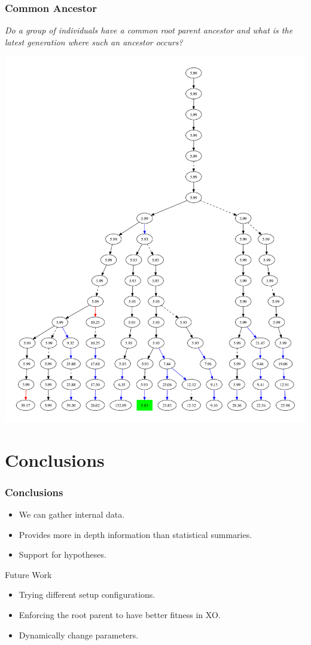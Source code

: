 \documentclass{beamer}
\newcommand{\linespace}{\vskip 0.25cm}
\begin{document}
\begin{frame}
\frametitle{Common Ancestor}
\emph{Do a group of individuals have a common root parent ancestor and what is the latest generation where such an ancestor occurs?}
\begin{center}
\includegraphics[height=0.75\textheight]{subset_confluence_trimmed}
\end{center}

\end{frame}

\section[Conclusions]{Conclusions}

\begin{frame}
\frametitle{Conclusions}

\begin{itemize}
\item We can gather internal data.
\item Provides more in depth information than statistical summaries. 
\item Support for hypotheses.
\end{itemize}
\linespace
\linespace
\linespace
\linespace

Future Work
\begin{itemize}
\item Trying different setup configurations.
\item Enforcing the root parent to have better fitness in XO.
\item Dynamically change parameters.
\end{itemize}
\end{frame}
\end{document}

